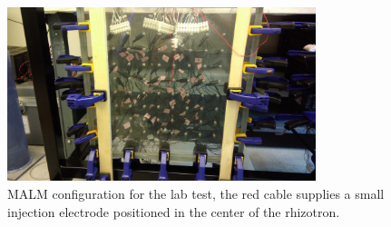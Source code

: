 \documentclass{article}
\begin{document}
\begin{figure}[b]
	\centering
	\captionsetup[sub]{margin=0.4cm}
	\includegraphics[width=9cm]{MALM_Labtest.jpg}
	\caption{MALM configuration for the lab test, the red cable supplies a small injection electrode positioned in the center of the rhizotron.\label{LabMALM}}
\end{figure}
\end{document}
